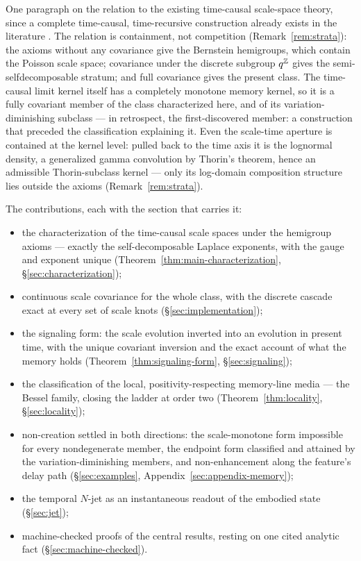 One paragraph on the relation to the existing time-causal scale-space theory, since a
complete time-causal, time-recursive construction already exists in the literature
. The relation is containment, not competition
(Remark~\ref{rem:strata}): the axioms without any covariance give the Bernstein hemigroups,
which contain the Poisson scale space; covariance under the discrete subgroup $q^{\mathbb{Z}}$
gives the semi-selfdecomposable stratum; and full covariance gives the present class. The
time-causal limit kernel itself has a completely monotone memory kernel, so it is a fully
covariant member of the class characterized here, and of its variation-diminishing
subclass --- in
retrospect, the first-discovered
member: a construction that preceded the classification explaining it. Even the scale-time
aperture is contained at the kernel level: pulled back to the time axis it is the lognormal
density, a generalized gamma convolution by Thorin's theorem, hence an admissible
Thorin-subclass kernel --- only its log-domain composition structure lies outside the
axioms (Remark~\ref{rem:strata}).

The contributions, each with the section that carries it:
\begin{itemize}
\item the characterization of the time-causal scale spaces under the hemigroup axioms ---
  exactly the self-decomposable Laplace exponents, with the gauge and exponent unique
  (Theorem~\ref{thm:main-characterization}, \S\ref{sec:characterization});
\item continuous scale covariance for the whole class, with the discrete cascade exact at
  every set of scale knots (\S\ref{sec:implementation});
\item the signaling form: the scale evolution inverted into an evolution in present time,
  with the unique covariant inversion and the exact account of what the memory holds
  (Theorem~\ref{thm:signaling-form}, \S\ref{sec:signaling});
\item the classification of the local, positivity-respecting memory-line media --- the
  Bessel family, closing the ladder at order two (Theorem~\ref{thm:locality},
  \S\ref{sec:locality});
\item non-creation settled in both directions: the scale-monotone form impossible for
  every nondegenerate member, the endpoint form classified and attained by the
  variation-diminishing members, and non-enhancement along the feature's
  delay path (\S\ref{sec:examples}, Appendix~\ref{sec:appendix-memory});
\item the temporal $N$-jet as an instantaneous readout of the embodied state
  (\S\ref{sec:jet});
\item machine-checked proofs of the central results, resting on one cited analytic fact
  (\S\ref{sec:machine-checked}).
\end{itemize}

